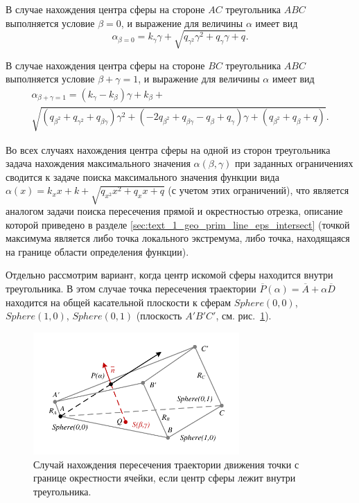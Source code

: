 В случае нахождения центра сферы на стороне $AC$ треугольника $ABC$ выполняется условие $\beta = 0$, и выражение для величины $\alpha$ имеет вид
\begin{equation}
	\alpha_{\beta = 0} = k_{\gamma} \gamma + \sqrt{q_{\gamma^2} \gamma^2 + q_{\gamma} \gamma + q}.
\end{equation}

В случае нахождения центра сферы на стороне $BC$ треугольника $ABC$ выполняется условие $\beta + \gamma = 1$, и выражение для величины $\alpha$ имеет вид
\begin{multline}
	\alpha_{\beta + \gamma = 1} = (k_{\gamma} - k_{\beta}) \gamma + k_{\beta} + \\
	\sqrt{(q_{\beta^2} + q_{\gamma^2} + q_{\beta \gamma}) \gamma^2 + (-2 q_{\beta^2} + q_{\beta \gamma} - q_{\beta} + q_{\gamma}) \gamma + (q_{\beta^2} + q_{\beta} + q)}.
\end{multline}

Во всех случаях нахождения центра сферы на одной из сторон треугольника задача нахождения максимального значения $\alpha(\beta, \gamma)$ при заданных ограничениях сводится к задаче поиска максимального значения функции вида $\alpha(x) = k_x x + k + \sqrt{q_{x^2} x^2 + q_x x + q}$ (с учетом этих ограничений), что является аналогом задачи поиска пересечения прямой и окрестностью отрезка, описание которой приведено в разделе \ref{sec:text_1_geo_prim_line_eps_intersect} (точкой максимума является либо точка локального экстремума, либо точка, находящаяся на границе области определения функции).

Отдельно рассмотрим вариант, когда центр искомой сферы находится внутри треугольника.
В этом случае точка пересечения траектории $\overline{P}(\alpha) = \overline{A} + \alpha \overline{D}$ находится на общей касательной плоскости к сферам $Sphere(0,0)$, $Sphere(1,0)$, $Sphere(0,1)$ (плоскость $A'B'C'$, см. рис.~\ref{fig:text_1_remesh_common_envelope_3}).

\begin{figure}[ht]
\centering
\includegraphics[width=0.7\textwidth]{fig/3dr_case1.pdf}
\singlespacing
{}\caption{Случай нахождения пересечения траектории движения точки с границе окрестности ячейки, если центр сферы лежит внутри треугольника.}
\label{fig:text_1_remesh_common_envelope_3}
\end{figure}

